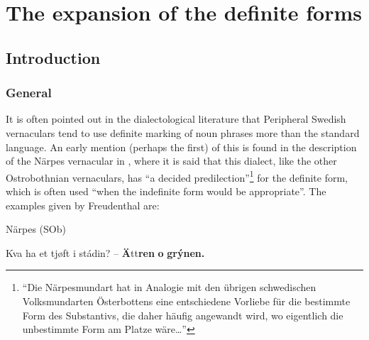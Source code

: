 
\chapter[The expansion of the definite forms]{\rmfamily The expansion of the definite forms}
\label{bkm:Ref155077895}\label{bkm:Ref156803843}\label{bkm:Ref160007852}\section{\rmfamily Introduction}
\subsection{\rmfamily General}

It is often pointed out in the dialectological literature that Peripheral Swedish vernaculars tend to use definite marking of noun phrases more than the standard language. An early mention (perhaps the first) of this is found in the description of the Närpes vernacular in \citet[137]{Freudenthal1878}, where it is said that this dialect, like the other Ostrobothnian vernaculars, has “a decided predilection”\footnote{ “Die Närpesmundart hat in Analogie mit den übrigen schwedischen Volksmundarten Österbottens eine entschiedene Vorliebe für die bestimmte Form des Substantivs, die daher häufig angewandt wird, wo eigentlich die unbestimmte Form am Platze wäre…”} for the definite form, which is often used “when the indefinite form would be appropriate”. The examples given by Freudenthal are:


\item 

Närpes (SOb)



\item 


 \ea\label{}
\gll Kva  ha  et  tjøft  i  stádin?  –  \textbf{Ä}tt\textbf{ren} \textbf{o} \textbf{grýnen.}\\


